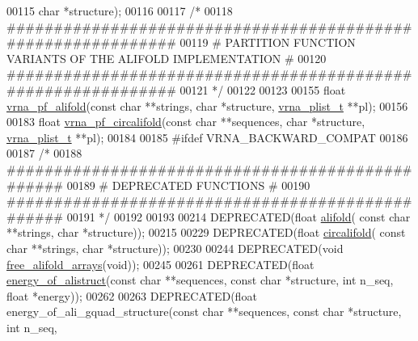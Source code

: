 \begin{DoxyCode}
00115                   \textcolor{keywordtype}{char} *structure);
00116 
00117 \textcolor{comment}{/*}
00118 \textcolor{comment}{#############################################################}
00119 \textcolor{comment}{# PARTITION FUNCTION VARIANTS OF THE ALIFOLD IMPLEMENTATION #}
00120 \textcolor{comment}{#############################################################}
00121 \textcolor{comment}{*/}
00122 
00123 
00155 \textcolor{keywordtype}{float} \hyperlink{group__consensus__pf__fold_gaef750636c70e597a85ee139197a4350d}{vrna\_pf\_alifold}(\textcolor{keyword}{const} \textcolor{keywordtype}{char} **strings, \textcolor{keywordtype}{char} *structure, 
      \hyperlink{group__data__structures_structvrna__plist__s}{vrna\_plist\_t} **pl);
00156 
00183 \textcolor{keywordtype}{float} \hyperlink{group__consensus__pf__fold_ga017209394a4c1e68d96cd47e61d16d25}{vrna\_pf\_circalifold}(\textcolor{keyword}{const} \textcolor{keywordtype}{char} **sequences, \textcolor{keywordtype}{char} *structure, 
      \hyperlink{group__data__structures_structvrna__plist__s}{vrna\_plist\_t} **pl);
00184 
00185 \textcolor{preprocessor}{#ifdef  VRNA\_BACKWARD\_COMPAT}
00186 
00187 \textcolor{comment}{/*}
00188 \textcolor{comment}{#################################################}
00189 \textcolor{comment}{# DEPRECATED FUNCTIONS                          #}
00190 \textcolor{comment}{#################################################}
00191 \textcolor{comment}{*/}
00192 
00193 
00214 DEPRECATED(\textcolor{keywordtype}{float} \hyperlink{group__consensus__mfe__fold_ga4cf00f0659e5f0480335d69e797f05b1}{alifold}( \textcolor{keyword}{const} \textcolor{keywordtype}{char} **strings, \textcolor{keywordtype}{char} *structure));
00215 
00229 DEPRECATED(\textcolor{keywordtype}{float} \hyperlink{group__consensus__mfe__fold_gadbd3b0b1c144cbfb4efe704b2b260f96}{circalifold}( \textcolor{keyword}{const} \textcolor{keywordtype}{char} **strings, \textcolor{keywordtype}{char} *structure));
00230 
00244 DEPRECATED(\textcolor{keywordtype}{void} \hyperlink{group__consensus__mfe__fold_ga72095e4554b5d577250ea14c42acc49e}{free\_alifold\_arrays}(\textcolor{keywordtype}{void}));
00245 
00261 DEPRECATED(\textcolor{keywordtype}{float} \hyperlink{group__consensus__fold_ga1c48869c03b49a342bf4cbdd61900081}{energy\_of\_alistruct}(\textcolor{keyword}{const} \textcolor{keywordtype}{char} **sequences, \textcolor{keyword}{const} \textcolor{keywordtype}{char} *structure, \textcolor{keywordtype}{int} 
      n\_seq, \textcolor{keywordtype}{float} *energy));
00262 
00263 DEPRECATED(\textcolor{keywordtype}{float} energy\_of\_ali\_gquad\_structure(\textcolor{keyword}{const} \textcolor{keywordtype}{char} **sequences, \textcolor{keyword}{const} \textcolor{keywordtype}{char} *structure, \textcolor{keywordtype}{int} n\_seq, \textcolor{keywordtype}{
}
\end{DoxyCode}
